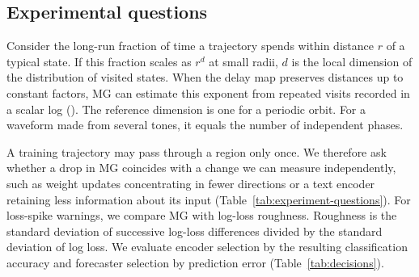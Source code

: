 {\subsection[Experimental questions]{Experimental questions}\label{sec:mg_conditions}
Consider the long-run fraction of time a trajectory spends within distance $r$ of a typical state. If this fraction scales as $r^d$ at small radii, $d$ is the local dimension of the distribution of visited states. When the delay map preserves distances up to constant factors, MG can estimate this exponent from repeated visits recorded in a scalar log (). The reference dimension is one for a periodic orbit. For a waveform made from several tones, it equals the number of independent phases.

A training trajectory may pass through a region only once. We therefore ask whether a drop in MG coincides with a change we can measure independently, such as weight updates concentrating in fewer directions or a text encoder retaining less information about its input (Table~\ref{tab:experiment-questions}). For loss-spike warnings, we compare MG with log-loss roughness. Roughness is the standard deviation of successive log-loss differences divided by the standard deviation of log loss. We evaluate encoder selection by the resulting classification accuracy and forecaster selection by prediction error (Table~\ref{tab:decisions}).

\ifdefined\newinmlcameraready\else

\fi
}
